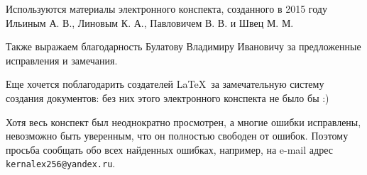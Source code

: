 \documentclass[../main.tex]{subfiles}
\begin{document}
{    \vspace{1.5em}
    
    Используются материалы электронного конспекта, созданного в 
    2015 году Ильиным А. В., Линовым К. А., Павловичем В. В. и 
    Швец М. М.

    \smallskip
    
    Также выражаем благодарность Булатову Владимиру Ивановичу за 
    предложенные исправления и замечания.
    
    \smallskip
    
    Еще хочется поблагодарить создателей \LaTeX\ за замечательную 
    систему создания документов: без них этого электронного 
    конспекта не было бы :)
    
    \smallskip
    
    Хотя весь конспект был неоднократно просмотрен, а многие ошибки исправлены,
    невозможно быть уверенным, что он полностью свободен от ошибок. Поэтому
    просьба сообщать обо всех найденных ошибках, например, на e-mail адрес
    \texttt{kernalex256@yandex.ru}.
}

\pagebreak
\end{document}
